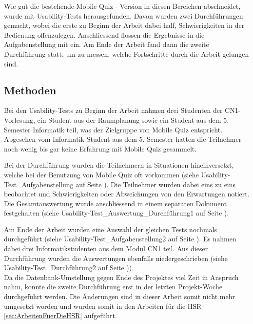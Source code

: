 Wie gut die bestehende Mobile Quiz - Version in diesen Bereichen abschneidet, wurde mit \gls{Usability-Test}s herausgefunden. Davon wurden zwei Durchführungen gemacht, wobei die erste zu Beginn der Arbeit dabei half, Schwierigkeiten in der Bedienung offenzulegen. Anschliessend flossen die Ergebnisse in die Aufgabenstellung mit ein. Am Ende der Arbeit fand dann die zweite Durchführung statt, um zu messen, welche Fortschritte durch die Arbeit gelungen sind.

\subsection{Methoden}
Bei den \gls{Usability-Test}s zu Beginn der Arbeit nahmen drei Studenten der \acrfull{CN1}-Vorlesung, ein Student aus der Raumplanung sowie ein Student aus dem 5. Semester Informatik teil, was der Zielgruppe von Mobile Quiz entspricht. Abgesehen vom Informatik-Student aus dem 5. Semester hatten die Teilnehmer noch wenig bis gar keine Erfahrung mit Mobile Quiz gesammelt.

Bei der Durchführung wurden die Teilnehmern in Situationen hineinversetzt, welche bei der Benutzung von Mobile Quiz oft vorkommen (siehe Usability-Test\_Aufgabenstellung auf Seite \hyperlink{page.\getpagerefnumber{pdf:UTAS1}}{}). Die Teilnehmer wurden dabei eins zu eins beobachtet und Schwierigkeiten oder Abweichungen von den Erwartungen notiert. Die Gesamtauswertung wurde anschliessend in einem separaten Dokument festgehalten (siehe Usability-Test\_Auswertung\_Durchführung1 auf Seite \hyperlink{page.\getpagerefnumber{pdf:UTAW1}}{}).

Am Ende der Arbeit wurden eine Auswahl der gleichen Tests nochmals durchgeführt (siehe Usability-Test\_Aufgabenstellung2 auf Seite \hyperlink{page.\getpagerefnumber{pdf:UTAS2}}{}). Es nahmen dabei drei Informatikstudenten aus dem Modul \gls{CN1} teil. Aus dieser Durchführung wurden die Auswertungen ebenfalls niedergeschrieben (siehe Usability-Test\_Durchführung2 auf Seite \hyperlink{page.\getpagerefnumber{pdf:UTAW2}}{})).\\

Da die Datenbank-Umstellung gegen Ende des Projektes viel Zeit in Anspruch nahm, konnte die zweite Durchführung erst in der letzten Projekt-Woche durchgeführt werden. Die Änderungen sind in dieser Arbeit somit nicht mehr umgesetzt worden und wurden somit in den Arbeiten für die HSR \ref{sec:ArbeitenFuerDieHSR} aufgeführt.


